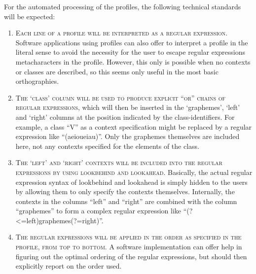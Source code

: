 For the automated processing of the profiles, the following technical standards will be expected:
\begin{enumerate}
	\def\labelenumi{\arabic{enumi}.} 
	\item \textsc{Each line of a profile will be interpreted as a regular expression. }Software applications using profiles can also offer to interpret a profile in the literal sense to avoid the necessity for the user to escape regular expressions metacharacters in the profile. However, this only is possible when no contexts or classes are described, so this seems only useful in the most basic orthographies. 
	\item \textsc{The `class' column will be used to produce explicit ``or'' chains of regular expressions}, which will then be inserted in the `graphemes', `left' and `right' columns at the position indicated by the class-identifiers. For example, a class ``V'' as a context specification might be replaced by a regular expression like ``(a\textbar{}e\textbar{}i\textbar{}o\textbar{}u\textbar{}ei\textbar{}au)''. Only the graphemes themselves are included here, not any contexts specified for the elements of the class. 
	\item \textsc{The `left' and `right' contexts will be included into the regular expressions by using lookbehind and lookahead}. Basically, the actual regular expression syntax of lookbehind and lookahead is simply hidden to the users by allowing them to only specify the contexts themselves. Internally, the contexts in the columns ``left'' and ``right'' are combined with the column ``graphemes'' to form a complex regular expression like ``(?\textless{}=left)graphemes(?=right)''. 
	\item \textsc{The regular expressions will be applied in the order as specified in the profile, from top to bottom.} A software implementation can offer help in figuring out the optimal ordering of the regular expressions, but should then explicitly report on the order used. 
\end{enumerate}

